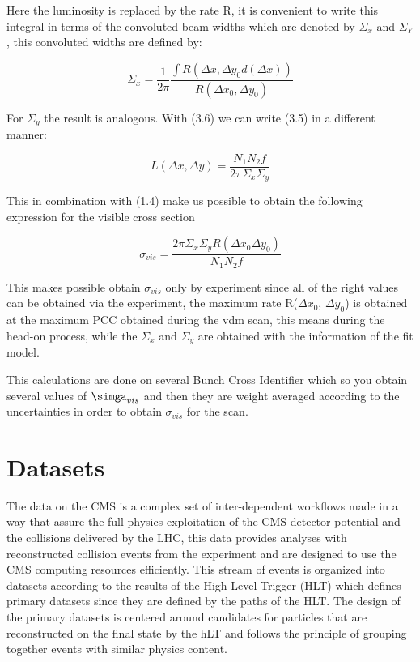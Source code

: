 Here the luminosity is replaced by the rate R, it is convenient to write this integral in terms of the convoluted beam widths which are denoted by $\Sigma_{x}$ and $\Sigma_{Y}$, this convoluted widths are defined by: 

\begin{equation}
\Sigma_{x} = \frac{1}{2 \pi} \frac{\int R(\Delta x, \Delta y_{0} d(\Delta x) )}{R(\Delta x_{0}, \Delta y_{0})}
\end{equation}

For $\Sigma_{y}$ the result is analogous. With (3.6) we can write (3.5) in a different manner:

\begin{equation}
L(\Delta x, \Delta y) = \frac{N_{1}N_{2}f}{2 \pi \Sigma_{x} \Sigma_{y}}
\end{equation}  

This in combination with (1.4) make us possible to obtain the following expression for the visible cross section

\begin{equation}
\sigma_{vis} = \frac{2 \pi \Sigma_{x} \Sigma_{y} R(\Delta x_{0} \Delta y_{0})}{N_{1} N_{2}f}
\end{equation}

This makes possible obtain $\sigma_{vis}$ only by experiment since all of the right values can be obtained via the experiment, the maximum rate R($\Delta x_{0}$, $\Delta y_{0}$) is obtained at the maximum PCC obtained during the vdm scan, this means during the head-on process, while the $\Sigma_{x}$ and $\Sigma_{y}$ are obtained with the information of the fit model. 

This calculations are done on several Bunch Cross Identifier which so you obtain several values of $\simga_{vis}$ and then they are weight averaged according to the uncertainties in order to obtain $\sigma_{vis}$ for the scan. 

\section{Datasets}

The data on the CMS is a complex set of inter-dependent workflows made in a way that assure the full physics exploitation of the CMS detector potential and the collisions delivered by the LHC, this data provides analyses with reconstructed collision events from the experiment and are designed to use the CMS computing resources efficiently. This stream of events is organized into datasets according to the results of the High Level Trigger (HLT) which defines primary datasets since they are defined by the paths of the HLT. The design of the primary datasets is centered around candidates for particles that are reconstructed on the final state by the hLT and follows the principle of grouping together events with similar physics content.    \cite{datasets1}

